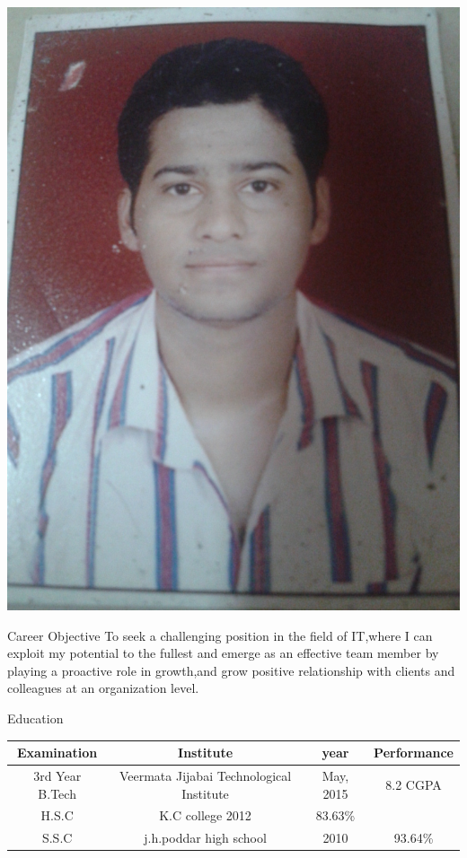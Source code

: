 \documentclass{resume} %
\begin{document}
\includegraphics[scale=0.09,angle=270]{4}

\begin{rSection}{Career Objective}
To seek a challenging  position in the field of IT,where I can exploit my  potential to the fullest and emerge as an effective team member by playing  a proactive role in growth,and grow positive relationship with clients and colleagues at an organization level.
\end{rSection}

\begin{rSection}{Education}
\begin{center}
	\begin{tabular}{||c|c|c|c||}
		\hline\hline
		\bf Examination & \bf Institute & \bf year & \bf Performance \\
		\hline\hline 
		3rd Year B.Tech & Veermata Jijabai Technological Institute & May, 2015 & 8.2 CGPA \\
		\hline
		H.S.C & K.C college 2012 & 83.63\% \\
		\hline
		S.S.C & j.h.poddar high school & 2010 & 93.64\% \\
		\hline\hline
		
		
	\end{tabular}
\end{center}

\end{rSection}
\end{document}
